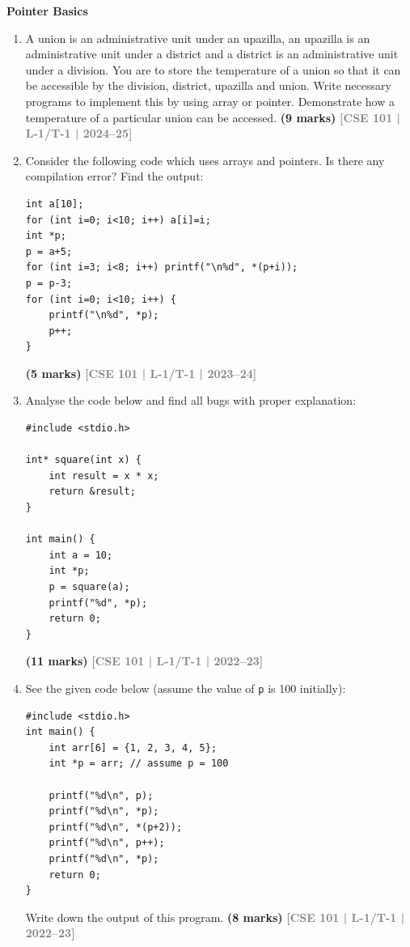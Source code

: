 \documentclass[12pt,a3paper]{article}
\newcommand{\yr}[1]{\hfill\textcolor{gray}{\small\textbf{[#1]}}}
\newcommand{\mk}[1]{\textcolor{orange!70!black}{\small\textbf{(#1 marks)}}}
\newcommand{\subtopic}[2]{%
  \vspace{10pt}
  \noindent\begin{tcolorbox}[colback=#1!8,colframe=#1,boxrule=0.6pt,arc=4pt,
    left=6pt,right=6pt,top=4pt,bottom=4pt]
    \small\bfseries\textcolor{#1}{#2}
  \end{tcolorbox}
  \vspace{2pt}
}
\begin{document}
\subtopic{cC}{Pointer Basics}
\label{sub:s5-ptrbasics}

\begin{enumerate}

  \item A union is an administrative unit under an upazilla, an upazilla is an administrative unit under a district and a district is an administrative unit under a division. You are to store the temperature of a union so that it can be accessible by the division, district, upazilla and union. Write necessary programs to implement this by using array or pointer. Demonstrate how a temperature of a particular union can be accessed.
  \mk{9} \yr{CSE 101 | L-1/T-1 | 2024--25}


\item Consider the following code which uses arrays and pointers. Is there any compilation error? Find the output:
 
\begin{lstlisting}
int a[10];
for (int i=0; i<10; i++) a[i]=i;
int *p;
p = a+5;
for (int i=3; i<8; i++) printf("\n%d", *(p+i));
p = p-3;
for (int i=0; i<10; i++) {
    printf("\n%d", *p);
    p++;
}
\end{lstlisting}
\mk{5} \yr{CSE 101 | L-1/T-1 | 2023--24}

\item Analyse the code below and find all bugs with proper explanation:
 
\begin{lstlisting}
#include <stdio.h>

int* square(int x) {
    int result = x * x;
    return &result;
}

int main() {
    int a = 10;
    int *p;
    p = square(a);
    printf("%d", *p);
    return 0;
}
\end{lstlisting}
\mk{11} \yr{CSE 101 | L-1/T-1 | 2022--23}

\item See the given code below (assume the value of \texttt{p} is 100 initially):
 
\begin{lstlisting}
#include <stdio.h>
int main() {
    int arr[6] = {1, 2, 3, 4, 5};
    int *p = arr; // assume p = 100

    printf("%d\n", p);
    printf("%d\n", *p);
    printf("%d\n", *(p+2));
    printf("%d\n", p++);
    printf("%d\n", *p);
    return 0;
}
\end{lstlisting}
Write down the output of this program.
\mk{8} \yr{CSE 101 | L-1/T-1 | 2022--23}


\end{enumerate}
\end{document}
